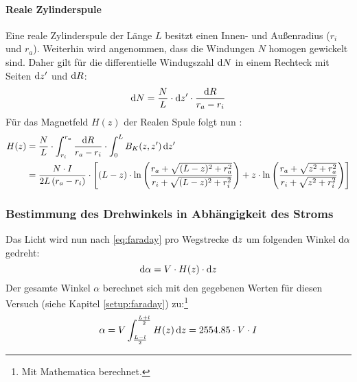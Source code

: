 \paragraph{Reale Zylinderspule}
Eine reale Zylinderspule der Länge $L$ besitzt einen Innen- und Außenradius ($r_i$ und $r_a$). 
Weiterhin wird angenommen, dass die Windungen $N$ homogen gewickelt sind. Daher gilt für die differentielle Windugszahl $\mathrm{d} N$ in einem 
Rechteck mit Seiten $\mathrm{d} z'$ und $\mathrm{d} R$:
\begin{equation}
  \mathrm{d} N = \frac{N}{L} \cdot \mathrm{d} z' \cdot \frac{\mathrm{d} R}{r_a - r_i}
\end{equation}
Für das Magnetfeld $H(z)$ der Realen Spule folgt nun \cite{herrmann}:
\begin{equation}
  \label{eq:hreal}
  \begin{split}
    H(z) &= \frac{N}{L} \cdot \int_{r_i}^{r_a} \frac{\mathrm{d} R}{r_a - r_i} \cdot \int_{0}^{L} B_K(z, z')\, \mathrm{d} z'\\
    &=\frac{N \cdot I}{2 L \left( r_a - r_i \right) } \cdot \left[ 
  	      (L-z) \cdot \ln \left( \frac{r_a + \sqrt{(L-z)^2  +r_a^2}}{r_i + \sqrt{(L-z)^2 + r_i^2}} \right) + 
  		  z \cdot \ln \left( \frac{r_a + \sqrt{z^2  +r_a^2}}{r_i + \sqrt{z^2 + r_i^2}} \right)  \right]
  \end{split}
\end{equation}
\subsubsection{Bestimmung des Drehwinkels in Abhängigkeit des Stroms}
\label{subsub:alpha}
Das Licht wird nun nach \autoref{eq:faraday} pro Wegstrecke $\mathrm{d} z$ um folgenden Winkel $\mathrm{d} \alpha$ gedreht:
\begin{equation}
  \mathrm{d} \alpha = V \cdot H(z) \cdot \mathrm{d} z
\end{equation}
Der gesamte Winkel $\alpha$ berechnet sich mit den gegebenen Werten für diesen Versuch (siehe Kapitel \ref{setup:faraday}) 
zu:\footnote{Mit Mathematica berechnet.}
\begin{equation}
  \label{eq:verdet}
  \alpha = V \int_{\frac{L-l}{2}}^{\frac{L+l}{2}} H(z)\, \mathrm{d} z = 2554.85 \cdot V \cdot I 
\end{equation}